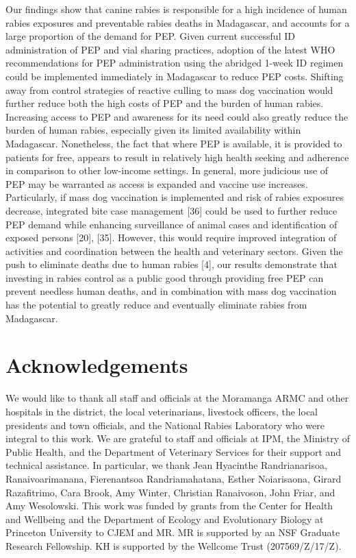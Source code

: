 \documentclass[
  oneside]{book}
\begin{document}
Our findings show that canine rabies is responsible for a high incidence of human rabies exposures and preventable rabies deaths in Madagascar, and accounts for a large proportion of the demand for PEP. Given current successful ID administration of PEP and vial sharing practices, adoption of the latest WHO recommendations for PEP administration using the abridged 1-week ID regimen could be implemented immediately in Madagascar to reduce PEP costs. Shifting away from control strategies of reactive culling to mass dog vaccination would further reduce both the high costs of PEP and the burden of human rabies. Increasing access to PEP and awareness for its need could also greatly reduce the burden of human rabies, especially given its limited availability within Madagascar. Nonetheless, the fact that where PEP is available, it is provided to patients for free, appears to result in relatively high health seeking and adherence in comparison to other low-income settings. In general, more judicious use of PEP may be warranted as access is expanded and vaccine use increases. Particularly, if mass dog vaccination is implemented and risk of rabies exposures decrease, integrated bite case management {[}36{]} could be used to further reduce PEP demand while enhancing surveillance of animal cases and identification of exposed persons {[}20{]}, {[}35{]}. However, this would require improved integration of activities and coordination between the health and veterinary sectors. Given the push to eliminate deaths due to human rabies {[}4{]}, our results demonstrate that investing in rabies control as a public good through providing free PEP can prevent needless human deaths, and in combination with mass dog vaccination has the potential to greatly reduce and eventually eliminate rabies from Madagascar.

\hypertarget{acknowledgements}{%
\section{Acknowledgements}\label{acknowledgements}}

We would like to thank all staff and officials at the Moramanga ARMC and other hospitals in the district, the local veterinarians, livestock officers, the local presidents and town officials, and the National Rabies Laboratory who were integral to this work. We are grateful to staff and officials at IPM, the Ministry of Public Health, and the Department of Veterinary Services for their support and technical assistance. In particular, we thank Jean Hyacinthe Randrianarisoa, Ranaivoarimanana, Fierenantsoa Randriamahatana, Esther Noiarisaona, Girard Razafitrimo, Cara Brook, Amy Winter, Christian Ranaivoson, John Friar, and Amy Wesolowski. This work was funded by grants from the Center for Health and Wellbeing and the Department of Ecology and Evolutionary Biology at Princeton University to CJEM and MR. MR is supported by an NSF Graduate Research Fellowship. KH is supported by the Wellcome Trust (207569/Z/17/Z).
\end{document}
